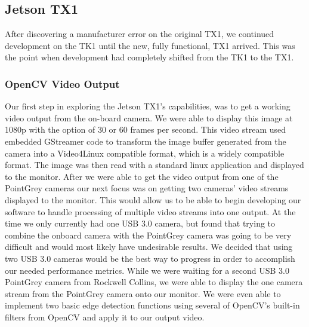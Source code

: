 \documentclass[letterpaper,10pt,titlepage]{IEEEtran}
\begin{document}
   \subsection{Jetson TX1}
   After discovering a manufacturer error on the original TX1, we continued development on the TK1 until the new, fully functional, TX1 arrived. This was the point when development had completely shifted from the TK1 to the TX1.\\ 
   
   \subsubsection{OpenCV Video Output}
   Our first step in exploring the Jetson TX1's capabilities, was to get a working video output from the on-board camera. We were able to display this image at 1080p with the option of 30 or 60 frames per second. This video stream used embedded GStreamer code to transform the image buffer generated from the camera into a Video4Linux compatible format, which is a widely compatible format. The image was then read with a standard linux application and displayed to the monitor. After we were able to get the video output from one of the PointGrey cameras our next focus was on getting two cameras' video streams displayed to the monitor. This would allow us to be able to begin developing our software to handle processing of multiple video streams into one output. At the time we only currently had one USB 3.0 camera, but found that trying to combine the onboard camera with the PointGrey camera was going to be very difficult and would most likely have undesirable results. We decided that using two USB 3.0 cameras would be the best way to progress in order to accomplish our needed performance metrics. While we were waiting for a second USB 3.0 PointGrey camera from Rockwell Collins, we were able to display the one camera stream from the PointGrey camera onto our monitor. We were even able to implement two basic edge detection functions using several of OpenCV's built-in filters from OpenCV and apply it to our output video.\\   
   
\end{document}
